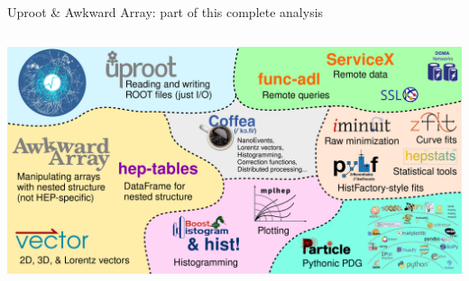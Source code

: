 \documentclass[aspectratio=169]{beamer}
\begin{document}

\begin{frame}{Uproot \& Awkward Array: part of this complete analysis}
\vspace{0.17 cm}
\begin{columns}
\includegraphics[width=\linewidth]{part-of-this-complete.pdf}
\end{columns}
\end{frame}
\end{document}
